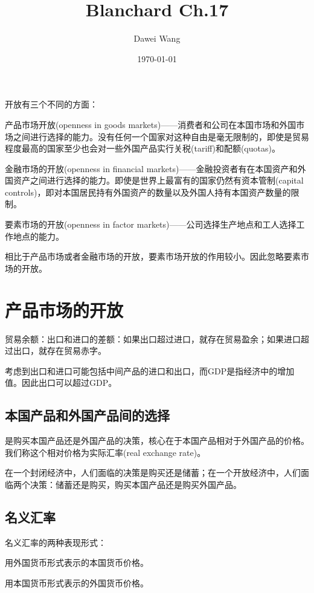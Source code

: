 \documentclass{article}
\title{Blanchard Ch.17}
\author{Dawei Wang}
\date{\today}
\begin{document}
	\maketitle
开放有三个不同的方面：

产品市场开放(openness in goods markets)——消费者和公司在本国市场和外国市场之间进行选择的能力。没有任何一个国家对这种自由是毫无限制的，即使是贸易程度最高的国家至少也会对一些外国产品实行关税(tariff)和配额(quotas)。

金融市场的开放(openness in financial markets)——金融投资者有在本国资产和外国资产之间进行选择的能力。即使是世界上最富有的国家仍然有资本管制(capital controls)，即对本国居民持有外国资产的数量以及外国人持有本国资产数量的限制。

要素市场的开放(openness in factor markets)——公司选择生产地点和工人选择工作地点的能力。

相比于产品市场或者金融市场的开放，要素市场开放的作用较小。因此忽略要素市场的开放。

\section{产品市场的开放}

贸易余额：出口和进口的差额：如果出口超过进口，就存在贸易盈余；如果进口超过出口，就存在贸易赤字。

考虑到出口和进口可能包括中间产品的进口和出口，而GDP是指经济中的增加值。因此出口可以超过GDP。

\subsection{本国产品和外国产品间的选择}

是购买本国产品还是外国产品的决策，核心在于本国产品相对于外国产品的价格。我们称这个相对价格为实际汇率(real exchange rate)。

在一个封闭经济中，人们面临的决策是购买还是储蓄；在一个开放经济中，人们面临两个决策：储蓄还是购买，购买本国产品还是购买外国产品。

\subsection{名义汇率}

名义汇率的两种表现形式：

用外国货币形式表示的本国货币价格。

用本国货币形式表示的外国货币价格。

\hspace*{\fill}
\end{document}
